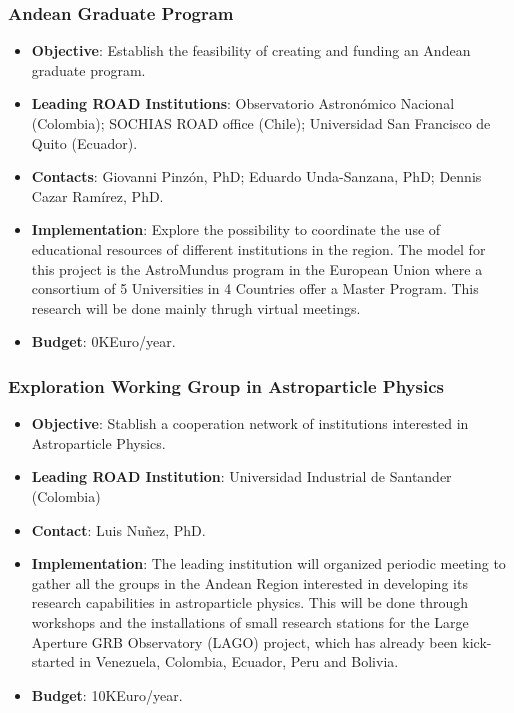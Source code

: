 \documentclass[12pt]{article}
\begin{document}
\subsubsection{Andean Graduate Program}
\begin{itemize}
\item{\bf Objective}: Establish the feasibility of creating and
  funding an Andean graduate program. 
\item{\bf Leading ROAD Institutions}: Observatorio Astron\'omico
  Nacional (Colombia); SOCHIAS ROAD office (Chile); Universidad San
  Francisco de Quito (Ecuador).
\item{\bf Contacts}: Giovanni Pinz\'on, PhD; Eduardo Unda-Sanzana,
  PhD; Dennis Cazar Ram\'irez, PhD. 
\item{\bf Implementation}:
  Explore the possibility to coordinate the use of
  educational resources of different institutions in the region. The
  model for this project is the AstroMundus program in the European
  Union where a consortium of 5 Universities in 4 Countries offer a
  Master Program.  This research will be done mainly thrugh virtual
  meetings.  
\item{\bf Budget}: 0KEuro/year.
\end{itemize}

\subsubsection{Exploration Working Group in Astroparticle Physics}
\begin{itemize}
\item{\bf Objective}: Stablish a cooperation network of institutions
  interested in Astroparticle Physics.
\item{\bf Leading ROAD Institution}: Universidad
  Industrial de Santander (Colombia) 
\item{\bf Contact}: Luis Nu\~nez, PhD.
\item{\bf Implementation}: The leading institution will organized
  periodic meeting to gather all the groups in the Andean Region
  interested in developing its research capabilities in astroparticle
  physics. This will be done through workshops and the installations
  of small research stations for the Large Aperture GRB Observatory
  (LAGO) project, which has already been kick-started 
  in Venezuela, Colombia, Ecuador, Peru and Bolivia.
\item{\bf Budget}: 10KEuro/year.
\end{itemize}
\end{document}
